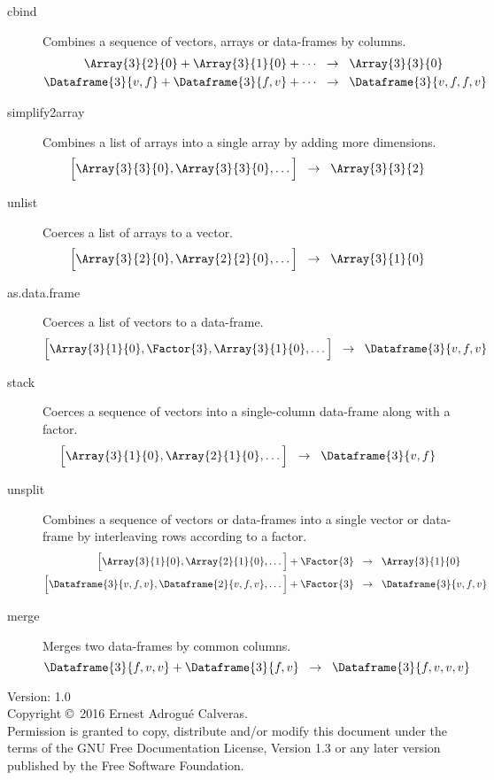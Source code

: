 \documentclass[a4paper,landscape]{article}
\newcommand{\Maps}{\;\;\rightarrow \;\;}
\begin{document}
\begin{multicols*}{3}
\begin{description}
\item[cbind] Combines a sequence of vectors, arrays or data-frames by
  columns.
  \begin{align*}
    \Array{3}{2}{0} + \Array{3}{1}{0} + \cdots &\Maps \Array{3}{3}{0} \\
    \Dataframe{3}{v,f} + \Dataframe{3}{f,v} + \cdots
                                               &\Maps \Dataframe{3}{v,f,f,v}
  \end{align*}

\item[simplify2array] Combines a list of arrays into a single array by
  adding more dimensions.
  \[ \List{\Array{3}{3}{0},\Array{3}{3}{0},\dots} \Maps \Array{3}{3}{2} \]

\item[unlist] Coerces a list of arrays to a vector.
  \[ \List{\Array{3}{2}{0},\Array{2}{2}{0},\dots} \Maps \Array{3}{1}{0} \]

\item[as.data.frame] Coerces a list of vectors to a data-frame.
  \[
  \List{\Array{3}{1}{0},\Factor{3},\Array{3}{1}{0},\dots} \Maps
  \Dataframe{3}{v,f,v}
  \]

\item[stack] Coerces a sequence of vectors into a single-column data-frame
  along with a factor.
  \[ \List{\Array{3}{1}{0},\Array{2}{1}{0},\dots} \Maps \Dataframe{3}{v,f} \]

\item[unsplit] Combines a sequence of vectors or data-frames into a single
  vector or data-frame by interleaving rows according to a factor.
  \begin{align*}
    \List{\Array{3}{1}{0},\Array{2}{1}{0},\dots} + \Factor{3}
    &\Maps \Array{3}{1}{0} \\
    \List{\Dataframe{3}{v,f,v},\Dataframe{2}{v,f,v},\dots} + \Factor{3}
    &\Maps \Dataframe{3}{v,f,v}
  \end{align*}

\item[merge] Merges two data-frames by common columns.
  \[ \Dataframe{3}{f,v,v} + \Dataframe{3}{f,v} \Maps
  \Dataframe{3}{f,v,v,v} \]
\end{description}

\vfill
\vrule width3cm height.5pt

\scriptsize
Version: 1.0 \\
Copyright \copyright\ 2016 Ernest Adrogu\'e Calveras. \\
Permission is granted to copy, distribute and/or modify this document under
the terms of the GNU Free Documentation License, Version 1.3 or any later
version published by the Free Software Foundation.


\end{multicols*}
\end{document}
